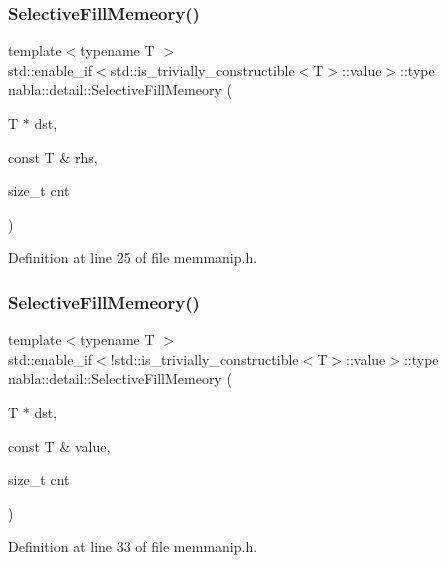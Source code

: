 \subsubsection{\texorpdfstring{SelectiveFillMemeory()}{SelectiveFillMemeory()}\hspace{0.1cm}{\footnotesize\ttfamily [1/2]}}
{\footnotesize\ttfamily template$<$typename T $>$ \\
std\+::enable\+\_\+if$<$std\+::is\+\_\+trivially\+\_\+constructible$<$T$>$\+::value$>$\+::type nabla\+::detail\+::\+Selective\+Fill\+Memeory (\begin{DoxyParamCaption}\item[{T $\ast$}]{dst,  }\item[{const T \&}]{rhs,  }\item[{size\+\_\+t}]{cnt }\end{DoxyParamCaption})}



Definition at line 25 of file memmanip.\+h.

\mbox{\label{namespacenabla_1_1detail_afe42a62d9b26104bee1800ccf1ec2191}} 
\subsubsection{\texorpdfstring{SelectiveFillMemeory()}{SelectiveFillMemeory()}\hspace{0.1cm}{\footnotesize\ttfamily [2/2]}}
{\footnotesize\ttfamily template$<$typename T $>$ \\
std\+::enable\+\_\+if$<$!std\+::is\+\_\+trivially\+\_\+constructible$<$T$>$\+::value$>$\+::type nabla\+::detail\+::\+Selective\+Fill\+Memeory (\begin{DoxyParamCaption}\item[{T $\ast$}]{dst,  }\item[{const T \&}]{value,  }\item[{size\+\_\+t}]{cnt }\end{DoxyParamCaption})}



Definition at line 33 of file memmanip.\+h.

